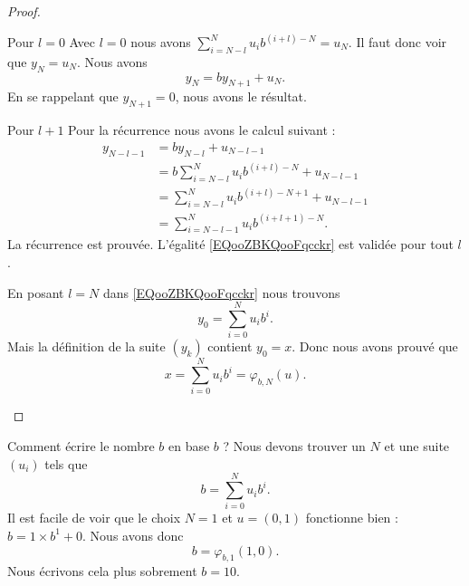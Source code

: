 \begin{proof}
\begin{subproof}
        \begin{subproof}
        \item[Pour \( l=0\)]
            Avec \( l=0\) nous avons \( \sum_{i=N-l}^Nu_ib^{(i+l)-N}=u_N\). Il faut donc voir que \( y_N=u_N\). Nous avons
            \begin{equation}
                y_N=by_{N+1}+u_N.
            \end{equation}
            En se rappelant que \( y_{N+1}=0\), nous avons le résultat.
        \item[Pour \( l+1\)]
            Pour la récurrence nous avons le calcul suivant :
            \begin{subequations}
                \begin{align}
                    y_{N-l-1}&=by_{N-l}+u_{N-l-1}\\
                    &=b\sum_{i=N-l}^Nu_ib^{(i+l)-N}+u_{N-l-1}\\
                    &=\sum_{i=N-l}^Nu_ib^{(i+l)-N+1}+u_{N-l-1}\\
                    &=\sum_{i=N-l-1}^Nu_ib^{(i+l+1)-N}.
                \end{align}
            \end{subequations}
            La récurrence est prouvée. L'égalité \eqref{EQooZBKQooFqcckr} est validée pour tout \( l\).
        \end{subproof}
        En posant \( l=N\) dans \eqref{EQooZBKQooFqcckr} nous trouvons
        \begin{equation}
            y_0=\sum_{i=0}^Nu_ib^i.
        \end{equation}
        Mais la définition de la suite \( (y_k)\) contient \( y_0=x\). Donc nous avons prouvé que
        \begin{equation}
            x=\sum_{i=0}^Nu_ib^i=\varphi_{b,N}(u).
        \end{equation}
    \end{subproof}
\end{proof}

\begin{example}
    Comment écrire le nombre \( b\) en base \( b\) ? Nous devons trouver un \( N\) et une suite \( (u_i)\) tels que
    \begin{equation}
        b=\sum_{i=0}^Nu_ib^i.
    \end{equation}
    Il est facile de voir que le choix \( N=1\) et \( u=(0,1)\) fonctionne bien : \( b=1\times b^1+0\). Nous avons donc
    \begin{equation}
        b=\varphi_{b,1}(1,0).
    \end{equation}
    Nous écrivons cela plus sobrement \( b=10\).
\end{example}

